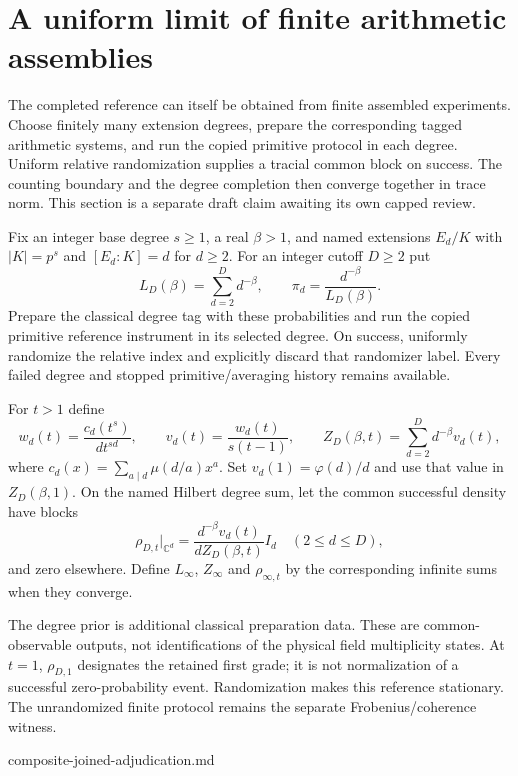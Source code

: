 \section{A uniform limit of finite arithmetic assemblies}
\label{sec:composite-joined-limit}

The completed reference can itself be obtained from finite assembled
experiments. Choose finitely many extension degrees, prepare the corresponding
tagged arithmetic systems, and run the copied primitive protocol in each
degree. Uniform relative randomization supplies a tracial common block on
success. The counting boundary and the degree completion then converge
together in trace norm. This section is a separate draft claim awaiting
its own capped review.

\begin{definition}
Fix an integer base degree $s\geq1$, a real $\beta>1$, and named extensions
$E_d/K$ with $|K|=p^s$ and $[E_d:K]=d$ for $d\geq2$. For an integer
cutoff $D\geq2$ put
\[
 L_D(\beta)=\sum_{d=2}^D d^{-\beta},\qquad
 \pi_d=\frac{d^{-\beta}}{L_D(\beta)}.
\]
Prepare the classical degree tag with these probabilities and run the
copied primitive reference instrument in its selected degree. On success,
uniformly randomize the relative index and explicitly discard that
randomizer label. Every failed degree and stopped primitive/averaging
history remains available.

For $t>1$ define
\[
 w_d(t)=\frac{c_d(t^s)}{dt^{sd}},\qquad
 v_d(t)=\frac{w_d(t)}{s(t-1)},\qquad
 Z_D(\beta,t)=\sum_{d=2}^D d^{-\beta}v_d(t),
\]
where $c_d(x)=\sum_{a\mid d}\mu(d/a)x^a$. Set
$v_d(1)=\varphi(d)/d$ and use that value in $Z_D(\beta,1)$.
On the named Hilbert degree sum, let the common successful density have
blocks
\[
 \rho_{D,t}\big|_{\mathbb C^d}
  =\frac{d^{-\beta}v_d(t)}{dZ_D(\beta,t)}I_d
       \quad(2\leq d\leq D),
\]
and zero elsewhere. Define $L_\infty$, $Z_\infty$ and $\rho_{\infty,t}$
by the corresponding infinite sums when they converge.
\end{definition}
\begin{scope}
The degree prior is additional classical preparation data. These are
common-observable outputs, not identifications of the physical field
multiplicity states. At $t=1$, $\rho_{D,1}$ designates the retained first
grade; it is not normalization of a successful zero-probability event.
Randomization makes this reference stationary. The unrandomized finite
protocol remains the separate Frobenius/coherence witness.
\end{scope}
{composite-joined-adjudication.md}

